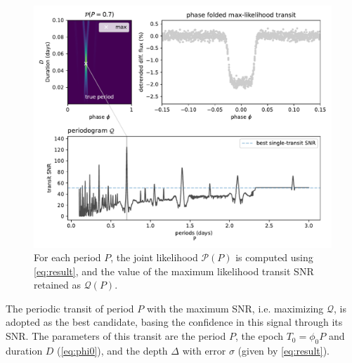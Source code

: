 \documentclass[modern]{aastex631}
\begin{document}
\begin{figure}[H]
    \begin{centering}
        \includegraphics[width=\linewidth]{../workflows/principle/figures/principle_Q.pdf}
        \caption{For each period $P$, the joint likelihood $\mathcal{P}(P)$ is computed using \autoref{eq:result}, and the value of the maximum likelihood transit SNR retained as $\mathcal{Q}(P)$.}
        \label{fig:periodogram}
    \end{centering}
\end{figure}
The periodic transit of period $P$ with the maximum SNR, i.e. maximizing $\mathcal{Q}$, is adopted as the best candidate, basing the confidence in this signal through its SNR. The parameters of this transit are the period $P$, the epoch $T_0 = \phi_0 P$ and duration $D$ (\autoref{eq:phi0}), and the depth $\Delta$ with error $\sigma$ (given by \autoref{eq:result}).
\end{document}
